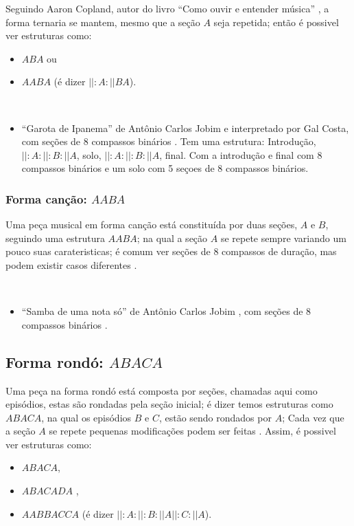 Seguindo  Aaron Copland, autor do livro ``Como ouvir e entender música'' \cite[pp. 89]{copland1974ouvir},
a forma ternaria se mantem, mesmo que a seção $A$ seja repetida;
então é possivel ver estruturas como: 
\begin{itemize}
\item $ABA$ ou
\item $AABA$ (é dizer $||:A:||BA$).
\end{itemize}

\begin{example} ~
\begin{itemize}
\item ``Garota de Ipanema'' de Antônio Carlos Jobim e interpretado por Gal Costa,
com seções de 8 compassos binários \cite{partituragarotaipanema1} \cite{partituragarotaipanema2}.
Tem uma estrutura: Introdução, $||:A:||:B:||A$, solo,  $||:A:||:B:||A$, final.
Com a introdução e final com 8 compassos binários 
e um solo com 5 seçoes de 8 compassos binários.
\end{itemize}
\end{example}

\subsubsection{Forma canção: $AABA$}
\label{subsec:formacancao}
Uma peça musical em forma canção está constituída por duas seções, $A$ e $B$,
seguindo uma estrutura $AABA$; 
na qual a seção $A$ se repete sempre variando um pouco suas carateristicas;
é comum ver seções de 8 compassos de duração, mas podem existir casos diferentes
\cite[pp. 53]{colluraimprovisacao} \cite[pp. 16]{adolfo1997composicao}.
\begin{example} ~
\begin{itemize}
\item ``Samba de uma nota só'' de Antônio Carlos Jobim \cite[pp. 53]{colluraimprovisacao} \cite[pp. 16]{adolfo1997composicao},
com seções de 8 compassos binários \cite{partiturasambadeumanotaso1}.
\end{itemize}
\end{example}

\subsection{Forma rondó: $ABACA$}
\label{subsec:formarondo}
Uma peça na forma rondó está composta por seções, 
chamadas aqui como episódios, estas são rondadas pela seção inicial;
é dizer temos estruturas como $ABACA$, na qual os episódios $B$ e $C$,
estão sendo rondados por $A$;
Cada vez que a seção $A$ se repete 
pequenas modificações podem ser feitas \cite[pp. 72]{bennett1993elementos}.
Assim, é possivel ver estruturas como: 
\begin{itemize}
\item $ABACA$,
\item $ABACADA$ \cite[pp. 98]{copland1974ouvir},
\item $AABBACCA$ (é dizer $||:A:||:B:||A||:C:||A$).
\end{itemize}

